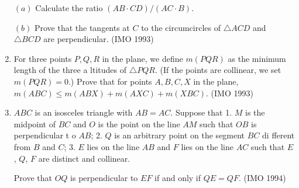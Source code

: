 \begin{enumerate}
  $(a)$ Calculate the ratio $(AB \cdot CD) / (AC \cdot B)$.
 
 $(b)$ Prove that the tangents at $C$ to the circumcircles of $\triangle ACD$ and $\triangle BCD$ are perpendicular. \hfill(IMO 1993)
		
\item For three points $P, Q, R$ in the plane, we define $m(PQR)$ as the minimum length of the three a
ltitudes of $\triangle PQR$. (If the points are collinear, we set $m(PQR) = 0$.)                                                                           
  Prove that for points $A, B, C, X$ in the plane,
                                                     $m(ABC) \leq m(ABX) + m(AXC) + m(XBC)$. \hfill(IMO 1993)
						     \item $ABC$ is an isosceles triangle with $AB = AC$. Suppose that                                                                                        
						1. $M$ is the midpoint of $BC$ and $O$ is the point on the line $AM$ such that $OB$ is perpendicular t    o $AB$;                                                                                                  
2. $Q$ is an arbitrary point on the segment $BC$ di    fferent from $B$ and $C$;                           
 3. $E$ lies on the line $AB$ and $F$ lies on the line $AC$ such that $E$, $Q$, $F$ are distinct and collinear.
 
		 Prove that $OQ$ is perpendicular to $EF$ if and only if $QE=QF$.    \hfill(IMO 1994)
\end{enumerate}
